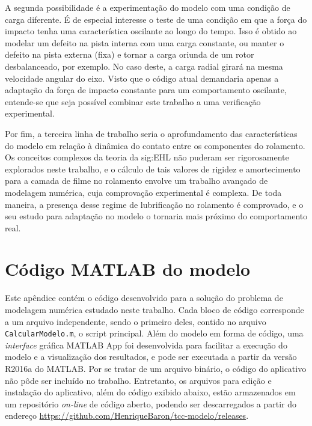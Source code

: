 \documentclass[12pt,oneside,english,brazil,lmodern,siglas,simbolos,cite=num]{ucsmonograph}
\begin{document}
	A segunda possibilidade é a experimentação do modelo com uma condição de carga diferente.
	É de especial interesse o teste de uma condição em que a força do impacto tenha uma característica oscilante ao longo do tempo.
	Isso é obtido ao modelar um defeito na pista interna com uma carga constante, ou manter o defeito na pista externa (fixa) e tornar a carga oriunda de um rotor desbalanceado, por exemplo.
	No caso deste, a carga radial girará na mesma velocidade angular do eixo.
	Visto que o código atual demandaria apenas a adaptação da força de impacto constante para um comportamento oscilante, entende-se que seja possível combinar este trabalho a uma verificação experimental.
	
	Por fim, a terceira linha de trabalho seria o aprofundamento das características do modelo em relação à dinâmica do contato entre os componentes do rolamento.
	Os conceitos complexos da teoria da \gls{sig:EHL} não puderam ser rigorosamente explorados neste trabalho, e o cálculo de tais valores de rigidez e amortecimento para a camada de filme no rolamento envolve um trabalho avançado de modelagem numérica, cuja comprovação experimental é complexa.
	De toda maneira, a presença desse regime de lubrificação no rolamento é comprovado, e o seu estudo para adaptação no modelo o tornaria mais próximo do comportamento real.
	
	\postextual
	
	
	
	\apendices
	\chapter{Código MATLAB\textsuperscript{\textregistered} do modelo} \label{apc:codigo}
	Este apêndice contém o código desenvolvido para a solução do problema de modelagem numérica estudado neste trabalho.
	Cada bloco de código corresponde a um arquivo independente, sendo o primeiro deles, contido no arquivo \texttt{CalcularModelo.m}, o \foreignlanguage{english}{script} principal.
	Além do modelo em forma de código, uma \emph{interface} gráfica MATLAB\textsuperscript{\textregistered} App foi desenvolvida para facilitar a execução do modelo e a visualização dos resultados, e pode ser executada a partir da versão R2016a do  MATLAB\textsuperscript{\textregistered}.
	Por se tratar de um arquivo binário, o código do aplicativo não pôde ser incluído no trabalho.
	Entretanto, os arquivos para edição e instalação do aplicativo, além do código exibido abaixo, estão armazenados em um repositório \emph{on-line} de código aberto, podendo ser descarregados a partir do endereço \url{https://github.com/HenriqueBaron/tcc-modelo/releases}.
	
\end{document}
